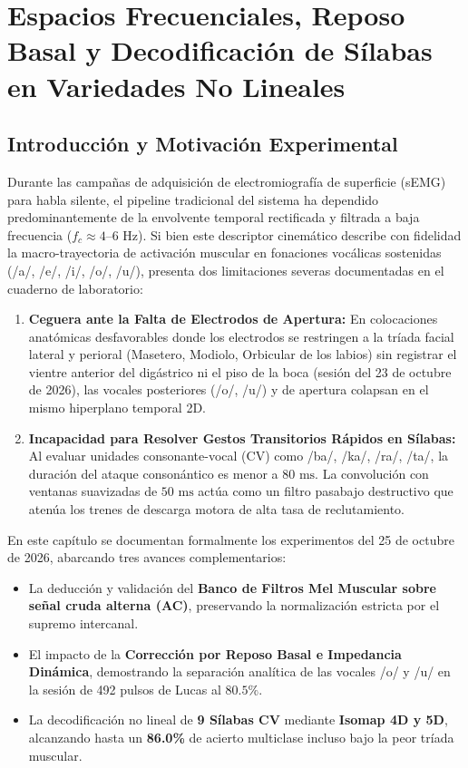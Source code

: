 \chapter{Espacios Frecuenciales, Reposo Basal y Decodificación de Sílabas en Variedades No Lineales}
\label{chap:frecuencia_silabas_isomap}

\section{Introducción y Motivación Experimental}
\label{sec:motivacion_mfcc_silabas}

Durante las campañas de adquisición de electromiografía de superficie (sEMG) para habla silente, el pipeline tradicional del sistema ha dependido predominantemente de la envolvente temporal rectificada y filtrada a baja frecuencia ($f_c \approx 4\text{--}6\text{ Hz}$). Si bien este descriptor cinemático describe con fidelidad la macro-trayectoria de activación muscular en fonaciones vocálicas sostenidas (/a/, /e/, /i/, /o/, /u/), presenta dos limitaciones severas documentadas en el cuaderno de laboratorio:
\begin{enumerate}
    \item \textbf{Ceguera ante la Falta de Electrodos de Apertura:} En colocaciones anatómicas desfavorables donde los electrodos se restringen a la tríada facial lateral y perioral (Masetero, Modiolo, Orbicular de los labios) sin registrar el vientre anterior del digástrico ni el piso de la boca (sesión del 23 de octubre de 2026), las vocales posteriores (/o/, /u/) y de apertura colapsan en el mismo hiperplano temporal 2D.
    \item \textbf{Incapacidad para Resolver Gestos Transitorios Rápidos en Sílabas:} Al evaluar unidades consonante-vocal (CV) como /ba/, /ka/, /ra/, /ta/, la duración del ataque consonántico es menor a $80\text{ ms}$. La convolución con ventanas suavizadas de $50\text{ ms}$ actúa como un filtro pasabajo destructivo que atenúa los trenes de descarga motora de alta tasa de reclutamiento.
\end{enumerate}

En este capítulo se documentan formalmente los experimentos del 25 de octubre de 2026, abarcando tres avances complementarios:
\begin{itemize}
    \item La deducción y validación del \textbf{Banco de Filtros Mel Muscular sobre señal cruda alterna (AC)}, preservando la normalización estricta por el supremo intercanal.
    \item El impacto de la \textbf{Corrección por Reposo Basal e Impedancia Dinámica}, demostrando la separación analítica de las vocales /o/ y /u/ en la sesión de 492 pulsos de Lucas al $80.5\%$.
    \item La decodificación no lineal de \textbf{9 Sílabas CV} mediante \textbf{Isomap 4D y 5D}, alcanzando hasta un \textbf{86.0\%} de acierto multiclase incluso bajo la peor tríada muscular.
\end{itemize}

